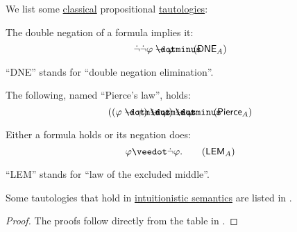 \begin{proposition}\label{thm:classical_tautologies}
  We list some \hyperref[def:propositional_semantics/classical]{classical} propositional \hyperref[def:propositional_tautology]{tautologies}:
  \begin{thmenum}
     The double negation of a formula implies it:
    \begin{equation}\label{eq:thm:classical_tautologies/dne}
      \synneg \synneg \varphi \synimplies \varphi \tag{\( \logic{DNE}_A \)}
    \end{equation}

    \enquote{DNE} stands for \enquote{double negation elimination}.

     The following, named \enquote{Pierce's law}, holds:
    \begin{equation}\label{eq:thm:classical_tautologies/pierce}
      ((\varphi \synimplies \psi) \synimplies \varphi) \synimplies \varphi \tag{\( \logic{Pierce}_A \)}
    \end{equation}

     Either a formula holds or its negation does:
    \begin{equation}\label{eq:thm:classical_tautologies/lem}
      \varphi \synvee \synneg \varphi. \tag{\( \logic{LEM}_A \)}
    \end{equation}

    \enquote{LEM} stands for \enquote{law of the excluded middle}.
  \end{thmenum}
\end{proposition}
\begin{comments}
  \item Some tautologies that hold in \hyperref[def:propositional_semantics/intuitionistic]{intuitionistic semantics} are listed in .
\end{comments}
\begin{proof}
  The proofs follow directly from the table in .
\end{proof}

